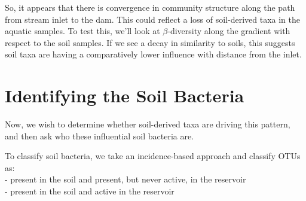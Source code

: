 \documentclass[]{article}
\begin{document}
So, it appears that there is convergence in community structure along
the path from stream inlet to the dam. This could reflect a loss of
soil-derived taxa in the aquatic samples. To test this, we'll look at
\(\beta\)-diversity along the gradient with respect to the soil samples.
If we see a decay in similarity to soils, this suggests soil taxa are
having a comparatively lower influence with distance from the inlet.

\hypertarget{identifying-the-soil-bacteria}{%
\section{Identifying the Soil
Bacteria}\label{identifying-the-soil-bacteria}}

Now, we wish to determine whether soil-derived taxa are driving this
pattern, and then ask who these influential soil bacteria are.

To classify soil bacteria, we take an incidence-based approach and
classify OTUs as:\\
- present in the soil and present, but never active, in the reservoir\\
- present in the soil and active in the reservoir
\end{document}
